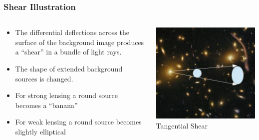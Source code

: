 \documentclass{beamer}
\begin{document}
	
\frame
{
    \frametitle{Shear Illustration}

    \begin{columns}
        \begin{column}{0.5\textwidth}    
            \begin{itemize}

                \item The differential deflections across the surface
                    of the background image produces a ``shear'' in a
                    bundle of light rays.

                \item The shape of extended background sources is changed.

                \item For strong lensing a round source becomes a ``banana''

                \item For {\color{gold} weak lensing} a round source becomes slightly elliptical

            \end{itemize}
        \end{column}
        \begin{column}{0.5\textwidth}
            \begin{center}
                \includegraphics[width=\textwidth]{shear-illustration-crop2.jpg}
                \newline
                {\small Tangential Shear}
            \end{center}
        \end{column}
    \end{columns}
}
\end{document}
